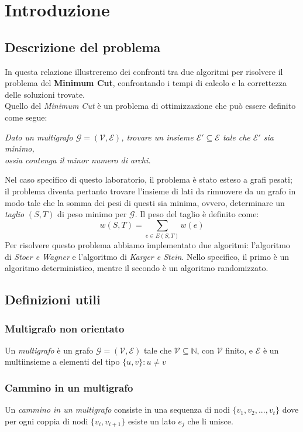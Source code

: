 \section{Introduzione}

\subsection{Descrizione del problema}
\label{descrizione_min_cut}
In questa relazione illustreremo dei confronti tra due algoritmi per risolvere il problema del \textbf{Minimum Cut}, confrontando i tempi di calcolo e la correttezza delle soluzioni trovate. \\
Quello del \textit{Minimum Cut} è un problema di ottimizzazione che può essere definito come segue:
\begin{center}
    \centering
    \textit{
        Dato un multigrafo $\mathcal{G}=(\mathcal{V}, \mathcal{E})$, trovare un insieme $\mathcal{E}{}'\subseteq \mathcal{E}$ tale che $\mathcal{E}{}'$ sia minimo,\\ ossia contenga il minor numero di archi.
    }
\end{center}
Nel caso specifico di questo laboratorio, il problema è stato esteso a grafi pesati; 
il problema diventa pertanto trovare l'insieme di lati da rimuovere da un grafo in 
modo tale che la somma dei pesi di questi sia minima, ovvero, determinare un 
\textit{taglio} $(S,T)$ di peso minimo per $\mathcal{G}$. Il peso del taglio è definito 
come: 
\[
    w(S,T) = \sum_{e \in E(S,T)} w(e)
\]
Per risolvere questo problema abbiamo implementato due algoritmi: l'algoritmo di \textit{Stoer e Wagner} e l'algoritmo di \textit{Karger e Stein}. Nello specifico, il primo è un algoritmo deterministico, mentre il secondo è un algoritmo randomizzato.

\subsection{Definizioni utili}

\subsubsection*{Multigrafo non orientato}
Un \textit{multigrafo} è un grafo $\mathcal{G}=(\mathcal{V}, \mathcal{E})$ tale che $\mathcal{V} \subseteq \mathbb{N}$, con $\mathcal{V}$ finito, e $\mathcal{E}$ è un multiinsieme a elementi del tipo $\{u, v\}: u\neq v$

\subsubsection*{Cammino in un multigrafo}
Un \textit{cammino in un multigrafo} consiste in una sequenza di nodi $\{v_1, v_2, ..., v_t\}$ dove per ogni coppia di nodi $\{v_i, v_{i+1}\}$ esiste un lato $e_j$ che li unisce.

